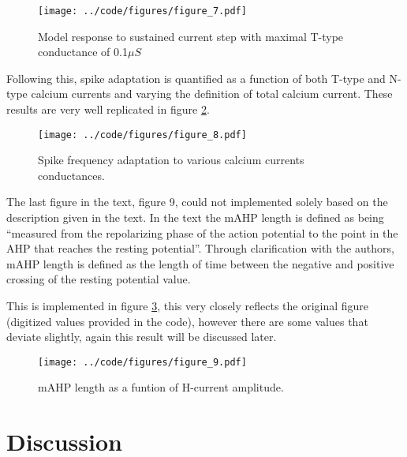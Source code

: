 \documentclass[10pt,a4paper,onecolumn]{article}
\renewcommand{\includegraphics}[2][]{\OldIncludegraphics[width=12cm, #1]{#2}}
\begin{document}
\begin{figure}
\centering
\texttt{[image: ../code/figures/figure\_7.pdf]}
\caption{Model response to sustained current step with maximal T-type
conductance of 0.1\(\mu S\) \label{fig:fig7}}
\end{figure}

Following this, spike adaptation is quantified as a function of both
T-type and N-type calcium currents and varying the definition of total
calcium current. These results are very well replicated in figure
\ref{fig:fig8}.

\begin{figure}
\centering
\texttt{[image: ../code/figures/figure\_8.pdf]}
\caption{Spike frequency adaptation to various calcium currents
conductances. \label{fig:fig8}}
\end{figure}

The last figure in the text, figure 9, could not implemented solely
based on the description given in the text. In the text the mAHP length
is defined as being ``measured from the repolarizing phase of the action
potential to the point in the AHP that reaches the resting potential''.
Through clarification with the authors, mAHP length is defined as the
length of time between the negative and positive crossing of the resting
potential value.

This is implemented in figure \ref{fig:fig9}, this very closely reflects
the original figure (digitized values provided in the code), however
there are some values that deviate slightly, again this result will be
discussed later.

\begin{figure}
\centering
\texttt{[image: ../code/figures/figure\_9.pdf]}
\caption{mAHP length as a funtion of H-current amplitude.
\label{fig:fig9}}
\end{figure}

\section{Discussion}\label{discussion}
\end{document}
